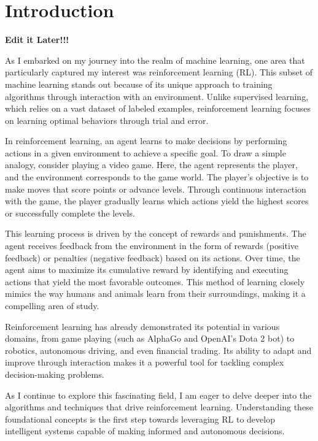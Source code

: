 \section{Introduction}

\textbf{\Huge{Edit it Later!!!}}

As I embarked on my journey into the realm of machine learning, one area that particularly captured my interest was reinforcement learning (RL). This subset of machine learning stands out because of its unique approach to training algorithms through interaction with an environment. Unlike supervised learning, which relies on a vast dataset of labeled examples, reinforcement learning focuses on learning optimal behaviors through trial and error.

In reinforcement learning, an agent learns to make decisions by performing actions in a given environment to achieve a specific goal. To draw a simple analogy, consider playing a video game. Here, the agent represents the player, and the environment corresponds to the game world. The player's objective is to make moves that score points or advance levels. Through continuous interaction with the game, the player gradually learns which actions yield the highest scores or successfully complete the levels.

This learning process is driven by the concept of rewards and punishments. The agent receives feedback from the environment in the form of rewards (positive feedback) or penalties (negative feedback) based on its actions. Over time, the agent aims to maximize its cumulative reward by identifying and executing actions that yield the most favorable outcomes. This method of learning closely mimics the way humans and animals learn from their surroundings, making it a compelling area of study.

Reinforcement learning has already demonstrated its potential in various domains, from game playing (such as AlphaGo and OpenAI's Dota 2 bot) to robotics, autonomous driving, and even financial trading. Its ability to adapt and improve through interaction makes it a powerful tool for tackling complex decision-making problems.

As I continue to explore this fascinating field, I am eager to delve deeper into the algorithms and techniques that drive reinforcement learning. Understanding these foundational concepts is the first step towards leveraging RL to develop intelligent systems capable of making informed and autonomous decisions.